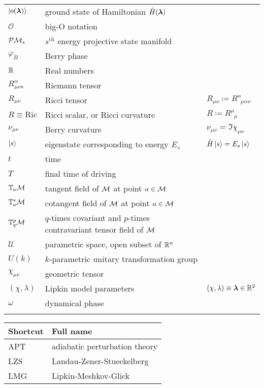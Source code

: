 \begin{tabular} {@{}C{1.9cm}@{}p{8cm}@{}C{3.77cm}}
	  $\ket{o({\bm\lambda})}$& ground state of Hamiltonian $\hat{H}({\bm\lambda})$  &  \\
	  $\mathcal O$& big-O notation  &  \\
	  $\mathcal{P}\mathcal{M}_s$& $s^{\text{th}}$ energy projective state manifold &  \\
	  $\varphi_B$ & Berry phase & \\
	  $\mathbb{R}$& Real numbers  &  \\
	  $R^\alpha_{\mu\nu\kappa}$ &Riemann tensor & \\
	  $R_{\mu\nu}$ & Ricci tensor & $R_{\mu\nu}\coloneqq R^\alpha_{\;\;\mu\alpha\nu}$\\
	  $R\equiv \mathrm{Ric}$ & Ricci scalar, or Ricci curvature & $R\coloneqq R^\mu_{\;\;\mu}$\\
	  $\nu_{\mu\nu}$ & Berry curvature & $\nu_{\mu\nu}= \Im\chi_{\mu\nu}$ \\ 
	  $\ket{s}$& eigenstate corresponding to energy $E_s$& $\hat{H}\ket{s}=E_s\ket{s}$ \\
	  $t$& time  &  \\
	  $T$& final time of driving  &  \\
	  $\mathbb T_a \mathcal{M}$& tangent field of $\mathcal{M}$ at point $a\in \mathcal{M}$ &  \\
	  $\mathbb T_a^* \mathcal{M}$& cotangent field of $\mathcal{M}$ at point $a\in \mathcal{M}$ &  \\
	  $\mathbb{T}^p_q\mathcal{M}$& $q$-times covariant and $p$-times contravariant tensor field of $\mathcal{M}$&  \\
	  $\mathcal U$& parametric space, open subset of $\mathbb{R}^n$  & \\
	  $U(k)$& $k$-parametric unitary transformation group  &  \\
	  $\chi_{\mu\nu}$ &geometric tensor &  \\
	  $(\chi,\lambda)$&Lipkin model parameters  & $(\chi,\lambda)\equiv {\bm\lambda}\in\mathbb{R}^2$ \\
		$\omega$ & dynamical phase \\
\bottomrule
{}
\end{tabular}



\begin{tabular} {@{}C{3cm}@{}p{9cm}}
	\toprule
	\textbf{Shortcut}& \textbf{Full name}\\\bottomrule
	
	APT & adiabatic perturbation theory \\
	LZS & Landau-Zener-Stueckelberg\\
	LMG & Lipkin-Meshkov-Glick \\
	\bottomrule
\end{tabular}


